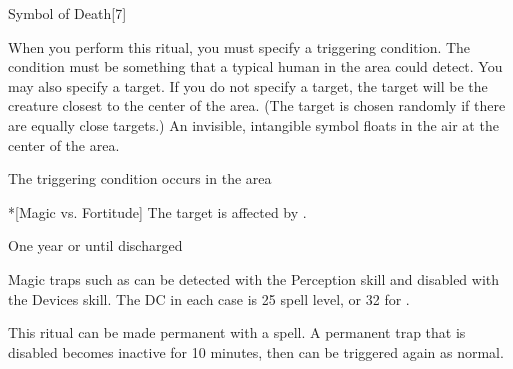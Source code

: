 \begin{spellsection}{Symbol of Death}[7]
    \begin{spellheader}
    \end{spellheader}
    \begin{spellcontent}
        \begin{spelltargetinginfo}
        \end{spelltargetinginfo}
        \begin{spelleffects}

            \spellspecial When you perform this ritual, you must specify a triggering condition. The condition must be something that a typical human in the area could detect. You may also specify a target. If you do not specify a target, the target will be the creature closest to the center of the area. (The target is chosen randomly if there are equally close targets.)
            \spellline
            \spelleffect An invisible, intangible symbol floats in the air at the center of the area.
            \begin{spelltrigger}{The triggering condition occurs in the area}
                \begin{spelltarget}*[Magic vs. Fortitude]
                    \spellsuccess The target is affected by .
                \end{spelltarget}
            \end{spelltrigger}

            \spelldur One year or until discharged
        \end{spelleffects}
    \end{spellcontent}
    \begin{spellfooter}
        \spellnotes Magic traps such as  can be detected with the Perception skill and disabled with the Devices skill. The DC in each case is 25 \add spell level, or 32 for .
        \par This ritual can be made permanent with a  spell. A permanent trap that is disabled becomes inactive for 10 minutes, then can be triggered again as normal.
    \end{spellfooter}
\end{spellsection}

